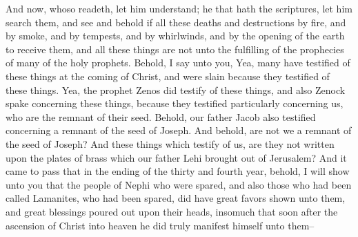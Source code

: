 And now, whoso readeth, let him understand; he that hath the scriptures, let him search them, and see and behold if all these deaths and destructions by fire, and by smoke, and by tempests, and by whirlwinds, and by the opening of the earth to receive them, and all these things are not unto the fulfilling of the prophecies of many of the holy prophets.
\bverse \iffalse Behold, I say unto you, Yea, many have testified of these things at the coming of Christ, and were slain because they testified of these things. \fi
Behold, I say unto you, Yea, many have testified of these things at the coming of Christ, and were slain because they testified of these things.
\bverse \iffalse Yea, the prophet Zenos did testify of these things, and also Zenock spake concerning these things, because they testified particularly concerning us, who are the remnant of their seed. \fi
Yea, the prophet Zenos did testify of these things, and also Zenock spake concerning these things, because they testified particularly concerning us, who are the remnant of their seed.
\bverse \iffalse Behold, our father Jacob also testified concerning a remnant of the seed of Joseph. And behold, are not we a remnant of the seed of Joseph? And these things which testify of us, are they not written upon the plates of brass which our father Lehi brought out of Jerusalem? \fi
Behold, our father Jacob also testified concerning a remnant of the seed of Joseph. And behold, are not we a remnant of the seed of Joseph? And these things which testify of us, are they not written upon the plates of brass which our father Lehi brought out of Jerusalem?
\bverse \iffalse And it came to pass that in the ending of the thirty and fourth year, behold, I will show unto you that the people of Nephi who were spared, and also those who had been called Lamanites, who had been spared, did have great favors shown unto them, and great blessings poured out upon their heads, insomuch that soon after the ascension of Christ into heaven he did truly manifest himself unto them-- \fi
And it came to pass that in the ending of the thirty and fourth year, behold, I will show unto you that the people of Nephi who were spared, and also those who had been called Lamanites, who had been spared, did have great favors shown unto them, and great blessings poured out upon their heads, insomuch that soon after the ascension of Christ into heaven he did truly manifest himself unto them--
\bverse \iffalse Showing his body unto them, and ministering unto them; and an account of his ministry shall be given hereafter. Therefore for this time I make an end of my sayings. \fi
